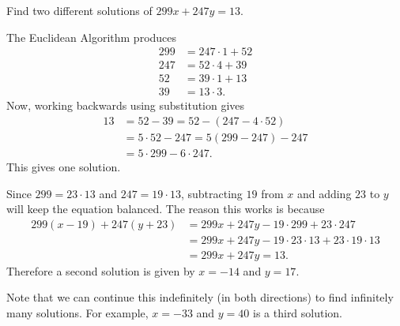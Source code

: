  Find two different solutions of $299x + 247y = 13$.
\begin{solution}
  The Euclidean Algorithm produces
  \begin{align*}
    299 &= 247\cdot1 + 52 \\
    247 &= 52\cdot4 + 39 \\
    52 &= 39\cdot1 + 13 \\
    39 &= 13\cdot3.
  \end{align*}
  Now, working backwards using substitution gives
  \begin{align*}
    13 &= 52 - 39 = 52 - (247 - 4\cdot52) \\
       &= 5\cdot52 - 247 = 5(299 - 247) - 247 \\
       &= 5\cdot299 - 6\cdot247.
  \end{align*}
  This gives one solution.

  Since $299 = 23\cdot13$ and $247 = 19\cdot13$, subtracting $19$ from
  $x$ and adding $23$ to $y$ will keep the equation
  balanced. The reason this works is because
  \begin{align*}
    299(x - 19) + 247(y + 23)
    &= 299x + 247y - 19\cdot299 + 23\cdot247 \\
    &= 299x + 247y - 19\cdot23\cdot13 + 23\cdot19\cdot13 \\
    &= 299x + 247y = 13.
  \end{align*}
  Therefore a second solution is given by $x = -14$ and $y = 17$.

  Note that we can continue this indefinitely (in both directions) to
  find infinitely many solutions. For example, $x = -33$ and $y = 40$
  is a third solution.
\end{solution}
